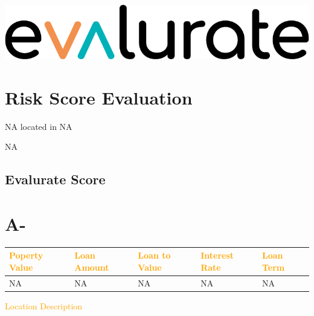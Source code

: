 \documentclass[]{article}
\title{}
\author{}
\date{}
\begin{document}
\includegraphics[width=0.3\linewidth]{evalurate}

\hypertarget{section}{%
\section{\texorpdfstring{\textcolor{lightteal}{Risk Score Evaluation}}{}}\label{section}}

NA located in NA

NA

\hypertarget{evalurate-score}{%
\subsection{Evalurate Score}\label{evalurate-score}}

\hypertarget{a-}{%
\section{A-}\label{a-}}

\begin{longtable}[]{@{}lllll@{}}
\toprule
\textcolor{orange}{Poperty Value} & \textcolor{orange}{Loan Amount} &
\textcolor{orange}{Loan to Value} & \textcolor{orange}{Interest Rate} &
\textcolor{orange}{Loan Term}\tabularnewline
\midrule
\endhead
NA & NA & NA & NA & NA\tabularnewline
\bottomrule
\end{longtable}

\textcolor{orange}{Location Description}
\end{document}

